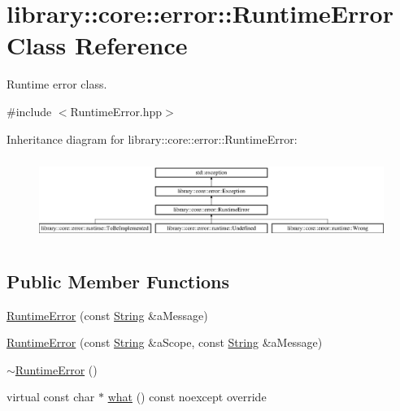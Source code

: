 \hypertarget{classlibrary_1_1core_1_1error_1_1_runtime_error}{}\section{library\+:\+:core\+:\+:error\+:\+:Runtime\+Error Class Reference}
\label{classlibrary_1_1core_1_1error_1_1_runtime_error}


Runtime error class.  




{\ttfamily \#include $<$Runtime\+Error.\+hpp$>$}

Inheritance diagram for library\+:\+:core\+:\+:error\+:\+:Runtime\+Error\+:\begin{figure}[H]
\begin{center}
\leavevmode
\includegraphics[height=2.715152cm]{classlibrary_1_1core_1_1error_1_1_runtime_error}
\end{center}
\end{figure}
\subsection*{Public Member Functions}
\begin{DoxyCompactItemize}
\item 
\hyperlink{classlibrary_1_1core_1_1error_1_1_runtime_error_a6ba0ac577d200ad5f83843ecbe775c2f}{Runtime\+Error} (const \hyperlink{classlibrary_1_1core_1_1types_1_1_string}{String} \&a\+Message)
\item 
\hyperlink{classlibrary_1_1core_1_1error_1_1_runtime_error_ac0e3fcfbbd3636c42dc6e64461e41d85}{Runtime\+Error} (const \hyperlink{classlibrary_1_1core_1_1types_1_1_string}{String} \&a\+Scope, const \hyperlink{classlibrary_1_1core_1_1types_1_1_string}{String} \&a\+Message)
\item 
\hyperlink{classlibrary_1_1core_1_1error_1_1_runtime_error_ab66a0df8767bf53b9910a15960622c0d}{$\sim$\+Runtime\+Error} ()
\item 
virtual const char $\ast$ \hyperlink{classlibrary_1_1core_1_1error_1_1_runtime_error_af3da31cf67f3f5e120c5db9072e3a801}{what} () const noexcept override
\end{DoxyCompactItemize}


